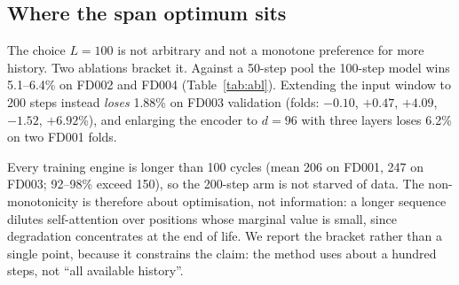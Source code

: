 
\subsection{Where the span optimum sits}

The choice $L=100$ is not arbitrary and not a monotone preference for more
history. Two ablations bracket it. Against a 50-step pool the 100-step model
wins 5.1--6.4\% on FD002 and FD004 (Table~\ref{tab:abl}). Extending the input
window to 200 steps instead \emph{loses} 1.88\% on FD003 validation
(folds: $-0.10$, $+0.47$, $+4.09$, $-1.52$, $+6.92$\%), and enlarging the
encoder to $d=96$ with three layers loses 6.2\% on two FD001 folds.

Every training engine is longer than 100 cycles (mean 206 on FD001, 247 on
FD003; 92--98\% exceed 150), so the 200-step arm is not starved of data. The
non-monotonicity is therefore about optimisation, not information: a longer
sequence dilutes self-attention over positions whose marginal value is small,
since degradation concentrates at the end of life. We report the bracket rather
than a single point, because it constrains the claim: the method uses about a
hundred steps, not ``all available history''.
